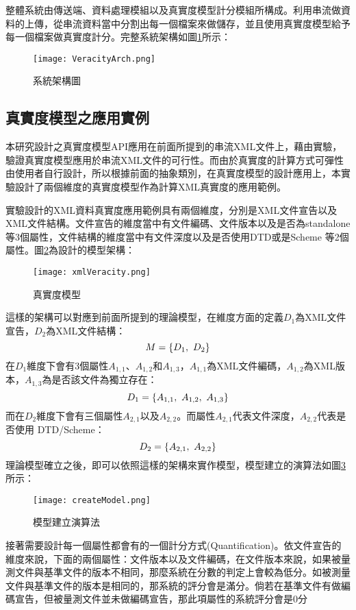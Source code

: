 整體系統由傳送端、資料處理模組以及真實度模型計分模組所構成。利用串流做資料的上傳，從串流資料當中分割出每一個檔案來做儲存，並且使用真實度模型給予每一個檔案做真實度計分。完整系統架構如圖\ref{system}所示：
\begin{figure}[H]
\centering
\graphicspath{{/Users/FUDA/Documents/masterThesis/image/}}
\texttt{[image: VeracityArch.png]}
\caption{系統架構圖}
\label{system}
\end{figure}
\newpage
\subsection{真實度模型之應用實例}
本研究設計之真實度模型API應用在前面所提到的串流XML文件上，藉由實驗，驗證真實度模型應用於串流XML文件的可行性。而由於真實度的計算方式可彈性由使用者自行設計，所以根據前面的抽象類別，在真實度模型的設計應用上，本實驗設計了兩個維度的真實度模型作為計算XML真實度的應用範例。\\\par
實驗設計的XML資料真實度應用範例具有兩個維度，分別是XML文件宣告以及XML文件結構。文件宣告的維度當中有文件編碼、文件版本以及是否為standalone等3個屬性，文件結構的維度當中有文件深度以及是否使用DTD或是Scheme 等2個屬性。圖\ref{veracitymodel}為設計的模型架構：
\begin{figure}[H]
\centering
\graphicspath{{/Users/FUDA/Documents/masterThesis/image/}}
\texttt{[image: xmlVeracity.png]}
\caption{真實度模型}
\label{veracitymodel}
\end{figure}

這樣的架構可以對應到前面所提到的理論模型，在維度方面的定義$D_1$為XML文件宣告，$D_2$為XML文件結構：
$$
M=\{D_1,\ D_2\}\\
$$
在$D_1$維度下會有3個屬性$A_{1,1}$、$A_{1,2}$和$A_{1,3}$，$A_{1,1}$為XML文件編碼，$A_{1,2}$為XML版本，$A_{1,3}$為是否該文件為獨立存在：
$$
D_1=\{A_{1,1},\ A_{1,2},\ A_{1,3}\}\\
$$
而在$D_2$維度下會有三個屬性$A_{2,1}$以及$A_{2,2}$。而屬性$A_{2,1}$代表文件深度，$A_{2,2}$代表是否使用 DTD/Scheme：
$$
D_2=\{A_{2,1},\ A_{2,2}\}\\
$$
理論模型確立之後，即可以依照這樣的架構來實作模型，模型建立的演算法如圖\ref{createmodel}所示：
\begin{figure}[H]
\centering
\graphicspath{{/Users/FUDA/Documents/masterThesis/image/}}
\texttt{[image: createModel.png]}
\caption{模型建立演算法}
\label{createmodel}
\end{figure}

接著需要設計每一個屬性都會有的一個計分方式(Quantification)。依文件宣告的維度來說，下面的兩個屬性：文件版本以及文件編碼，在文件版本來說，如果被量測文件與基準文件的版本不相同，那麼系統在分數的判定上會較為低分。如被測量文件與基準文件的版本是相同的，那系統的評分會是滿分。倘若在基準文件有做編碼宣告，但被量測文件並未做編碼宣告，那此項屬性的系統評分會是0分\\\par

